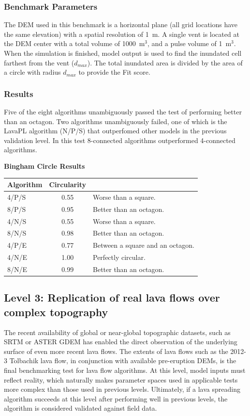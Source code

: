 \documentclass[12pt,letter]{article}
\begin{document}
		\subsubsection{Benchmark Parameters} The DEM used in this benchmark is a horizontal plane (all grid locations have the same elevation) with a spatial resolution of 1~m. A single vent is located at the DEM center with a total volume of 1000~m$^3$, and a pulse volume of 1~m$^3$. When the simulation is finished, model output is used to find the inundated cell farthest from the vent ($d_{max}$). The total inundated area is divided by the area of a circle with radius $d_{max}$ to provide the Fit score.
		
		\subsubsection{Results}

		Five of the eight algorithms unambiguously passed the test of performing better than an octagon. Two algorithms unambiguously failed, one of which is the LavaPL algorithm (N/P/S) that outperfomed other models in the previous validation level. In this test 8-connected algorithms outperformed 4-connected algorithms.
		
		\begin{center}
			\textbf{Bingham Circle Results}\\
			\begin{tabular}{l c l}
				\toprule
				Algorithm&Circularity&\\
				\midrule
				4/P/S & 0.55 & Worse than a square.\\
				8/P/S & 0.95 & Better than an octagon.\\
				4/N/S & 0.55 & Worse than a square.\\
				8/N/S & 0.98 & Better than an octagon.\\
				4/P/E & 0.77 & Between a square and an octagon.\\
				4/N/E & 1.00 & Perfectly circular.\\
				8/N/E & 0.99 & Better than an octagon.\\
				
				\bottomrule
			\end{tabular}
		\end{center}
		
	\subsection{Level 3: Replication of real lava flows over complex topography}
		The recent availability of global or near-global topographic datasets, such as SRTM or ASTER GDEM has enabled the direct observation of the underlying surface of even more recent lava flows. The extents of lava flows such as the 2012-3 Tolbachik lava flow, in conjunction with available pre-eruption DEMs, is the final benchmarking test for lava flow algorithms. At this level, model inputs must reflect reality, which naturally makes parameter spaces used in applicable tests more complex than those used in previous levels. Ultimately, if a lava spreading algorithm succeeds at this level after performing well in previous levels, the algorithm is considered validated against field data.
\end{document}

